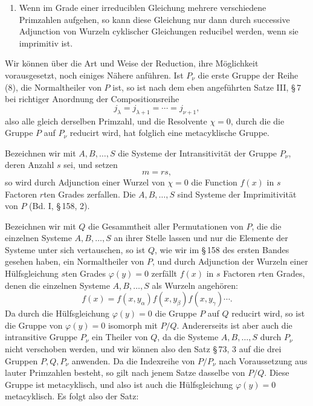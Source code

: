 \documentclass[11pt]{article}
\begin{document}
\begin{enumerate}[label=\arabic*.,leftmargin=2.6em]
\item Wenn im Grade einer irreduciblen Gleichung mehrere verschiedene Primzahlen aufgehen, so kann diese Gleichung nur dann durch successive Adjunction von Wurzeln cyklischer Gleichungen reducibel werden, wenn sie imprimitiv ist.
\end{enumerate}

Wir können über die Art und Weise der Reduction, ihre Möglichkeit vorausgesetzt, noch einiges Nähere anführen. Ist $P_\nu$ die erste Gruppe der Reihe (8), die Normaltheiler von $P$ ist, so ist nach dem eben angeführten Satze III, \S\,7 bei richtiger Anordnung der Compositionsreihe
\begin{equation}
 j_\lambda=j_{\lambda+1}=\cdots=j_{\nu+1},
 \tag{9}
\end{equation}
also alle gleich derselben Primzahl, und die Resolvente $\chi=0$, durch die die Gruppe $P$ auf $P_\nu$ reducirt wird, hat folglich eine metacyklische Gruppe.

Bezeichnen wir mit $A,B,\ldots,S$ die Systeme der Intransitivität der Gruppe $P_\nu$, deren Anzahl $s$ sei, und setzen
\begin{equation}
 m=rs,
 \tag{10}
\end{equation}
so wird durch Adjunction einer Wurzel von $\chi=0$ die Function $f(x)$ in $s$ Factoren $r$ten Grades zerfallen. Die $A,B,\ldots,S$ sind Systeme der Imprimitivität von $P$ (Bd. I, \S\,158, 2).

Bezeichnen wir mit $Q$ die Gesammtheit aller Permutationen von $P$, die die einzelnen Systeme $A,B,\ldots,S$ an ihrer Stelle lassen und nur die Elemente der Systeme unter sich vertauschen, so ist $Q$, wie wir im \S\,158 des ersten Bandes gesehen haben, ein Normaltheiler von $P$, und durch Adjunction der Wurzeln einer Hülfsgleichung $s$ten Grades $\varphi(y)=0$ zerfällt $f(x)$ in $s$ Factoren $r$ten Grades, denen die einzelnen Systeme $A,B,\ldots,S$ als Wurzeln angehören:
\[
 f(x)=f(x,y_\alpha)f(x,y_\beta)f(x,y_\gamma)\cdots .
\]
Da durch die Hülfsgleichung $\varphi(y)=0$ die Gruppe $P$ auf $Q$ reducirt wird, so ist die Gruppe von $\varphi(y)=0$ isomorph mit $P/Q$. Andererseits ist aber auch die intransitive Gruppe $P_\nu$ ein Theiler von $Q$, da die Systeme $A,B,\ldots,S$ durch $P_\nu$ nicht verschoben werden, und wir können also den Satz \S\,73, 3 auf die drei Gruppen $P,Q,P_\nu$ anwenden. Da die Indexreihe von $P/P_\nu$ nach Voraussetzung aus lauter Primzahlen besteht, so gilt nach jenem Satze dasselbe von $P/Q$. Diese Gruppe ist metacyklisch, und also ist auch die Hülfsgleichung $\varphi(y)=0$ metacyklisch. Es folgt also der Satz:
\end{document}
